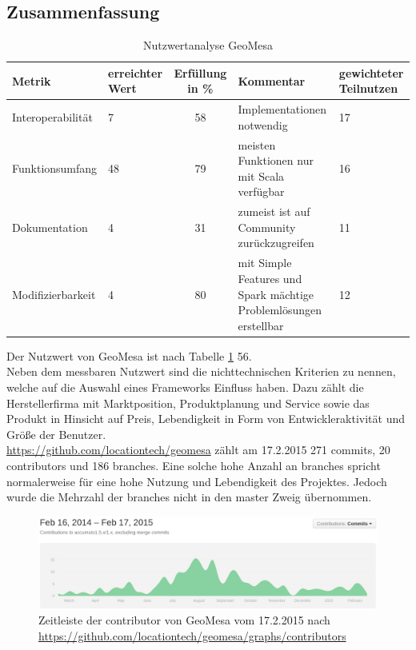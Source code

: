 \subsection{Zusammenfassung}
\begin{table}[h!]
\centering
\small
\begin{tabular}{l|p{1.8cm}|c|p{3.1cm}|p{1.8cm}}
\textbf{Metrik} & \textbf{erreichter Wert} & \textbf{Erfüllung in \%} & \textbf{Kommentar} & \textbf{gewichteter Teilnutzen} \\ \hline
Interoperabilität & 7 & 58 & Implementationen notwendig & 17 \\ \hline
Funktionsumfang & 48 & 79 & meisten Funktionen nur mit Scala verfügbar & 16 \\ \hline
Dokumentation & 4 & 31 & zumeist ist auf Community zurückzugreifen & 11 \\ \hline
Modifizierbarkeit & 4 & 80 & mit Simple Features und Spark mächtige Problemlösungen erstellbar & 12 \\
\end{tabular}
\caption{Nutzwertanalyse GeoMesa}
\label{table:nutzwertanalyse-geomesa}
\end{table}
Der Nutzwert von GeoMesa ist nach Tabelle \ref{table:nutzwertanalyse-geomesa} 56.\\
Neben dem messbaren Nutzwert sind die nichttechnischen Kriterien zu nennen, welche auf die Auswahl eines Frameworks Einfluss haben.
Dazu zählt die Herstellerfirma mit Marktposition, Produktplanung und Service sowie das Produkt in Hinsicht auf Preis, Lebendigkeit in Form von Entwickleraktivität und Größe der Benutzer.\\
\url{https://github.com/locationtech/geomesa} zählt am 17.2.2015 271 commits, 20 contributors und 186 branches.
Eine solche hohe Anzahl an branches spricht normalerweise für eine hohe Nutzung und Lebendigkeit des Projektes.
Jedoch wurde die Mehrzahl der branches nicht in den master Zweig übernommen.
\begin{figure}[h!]
\centering
\includegraphics[width=\textwidth]{Abbildungen/geomesa_timeline_contributors.png}
\caption[Zeitleiste der contributor von GeoMesa]{Zeitleiste der contributor von GeoMesa vom 17.2.2015 nach \url{https://github.com/locationtech/geomesa/graphs/contributors}}
\label{fig:timeline_contr_geomesa}
\end{figure}
